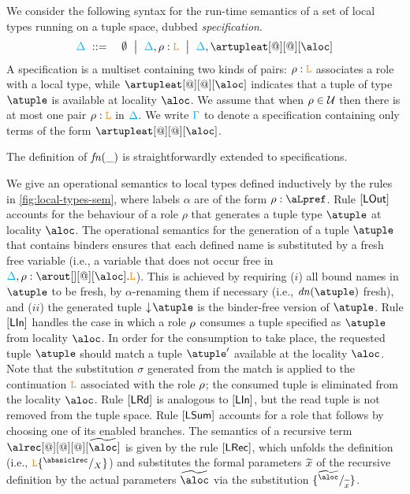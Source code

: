 We consider the following syntax for the run-time semantics of a set
of local types running on a tuple space, dubbed \emph{specification}.
%
\begin{eqnarray*}
  \envmv & \bnfdef & \emptyset \bnfmid
                  \envmv, \arole :  \aL \bnfmid
                  \envmv, \artupleat[@][@][\aloc]                  
\end{eqnarray*}
%
%
A specification is a multiset containing two kinds of pairs:
$\rho : \texttt{\textcolor{orange}L}$ associates a role with a local type, while $\artupleat[@][@][\aloc]$
indicates that a tuple of type $\atuple$ is available at locality
$\aloc$.
%
We assume that when $\rho\in\mathcal{U}$ then there is at most one pair $\rho : \texttt{\textcolor{orange}L}$ in $\textcolor{cyan}{\Delta}$.
We write $\textcolor{cyan}{\Gamma}$ to denote a specification containing only
terms of the form $\artupleat[@][@][\aloc]$. 

The definition of ${\it fn}(\_)$ is straightforwardly  extended to specifications. 

We give an operational semantics to local types defined inductively by 
the rules in \cref{fig:local-types-sem}, where labels $\alpha$ are of the form 
$\arole : \aLpref$. Rule $\mathsf{[LOut]}$ 
accounts  for the behaviour of a role $\rho$ that  generates a tuple type $\atuple$ at 
locality $\aloc$. The operational semantics for the generation of a tuple $\atuple$ that 
contains binders ensures that  each defined name  is substituted by a fresh free variable 
 (i.e., a variable that does not occur free in $\envmv, \arole : \arout[][@][\aloc].\aL$).
This is achieved by requiring  ($i$) all bound names in $\atuple$ to be fresh, by $\alpha$-renaming them if necessary (i.e., $\dn\atuple$  fresh), and 
($ii$)  the generated tuple $\eraseB\atuple$ is the binder-free version of $\atuple$. 
Rule $\mathsf{[LIn]}$ handles the case in which a role $\rho$
consumes  a tuple specified as $\atuple$ from locality $\aloc$. In order for the consumption to
take place, the  requested tuple $\atuple$ should match  a tuple $\atuple'$ available 
at the locality $\aloc$. 
Note that the substitution $\sigma$ generated from the match is applied 
to the continuation $\texttt{\textcolor{orange}L}$ associated with the role $\rho$; the
consumed tuple is eliminated from the locality $\aloc$. 
%
Rule $\mathsf{[LRd]}$ is analogous to $\mathsf{[LIn]}$, but the 
read tuple is not removed from the tuple space.
%
Rule $\mathsf{[LSum]}$ accounts for a role that follows by choosing one of 
its enabled branches. 
%
The semantics of a recursive term $\alrec[@][@][@][\seq \aloc]$ is
given by the rule $\mathsf{[LRec]}$, which unfolds the definition
(i.e., $\aL\sust X{\abasiclrec}$) and substitutes the formal parameters
$\widetilde{x}$ of the recursive definition by the actual parameters
$\seq\aloc$ via the substitution
$\sust {\seq x}{\seq \aloc}$.
 

